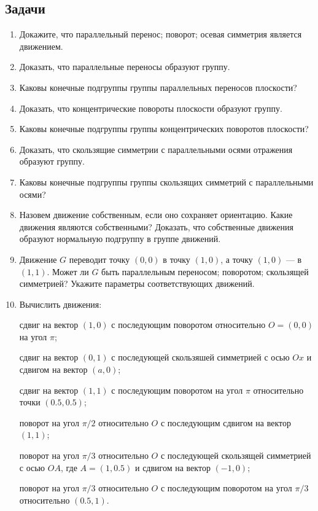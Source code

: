 \subsection*{Задачи}

\begin{enumerate}
\item Докажите, что \ipunkt параллельный перенос; \ipunkt поворот; \ipunkt осевая симметрия является движением.
\item Доказать, что параллельные переносы образуют группу.
\item Каковы конечные подгруппы группы параллельных переносов плоскости?
\item Доказать, что концентрические повороты плоскости образуют группу.
\item Каковы конечные подгруппы группы концентрических поворотов плоскости?
\item Доказать, что скользящие симметрии с параллельными осями отражения образуют группу.
\item Каковы конечные подгруппы группы скользящих симметрий с параллельными осями?
\item Назовем движение собственным, если оно сохраняет ориентацию. Какие движения являются собственными? Доказать, что собственные движения образуют нормальную подгруппу в группе движений.
\item Движение $G$ переводит точку $(0,0)$ в точку $(1,0)$, а точку $(1,0)$ --- в $(1,1)$. Может ли $G$ быть \ipunkt параллельным переносом; \ipunkt поворотом; \ipunkt скользящей симметрией? Укажите параметры соответствующих движений.
\item Вычислить движения:

\noindent\ipunkt сдвиг на вектор $(1,0)$ с последующим поворотом относительно $O=(0,0)$ на угол $\pi$;

\noindent\ipunkt сдвиг на вектор $(0,1)$ с последующей скользяшей симметрией с осью $Ox$ и сдвигом на вектор $(a,0)$;

\noindent\ipunkt сдвиг на вектор $(1,1)$ с последующим поворотом на угол $\pi$ относительно точки $(0.5,0.5)$;

\noindent\ipunkt поворот на угол $\pi/2$ относительно $O$ с последующим сдвигом на вектор $(1,1)$;

\noindent\ipunkt поворот на угол $\pi/3$ относительно $O$ с последующей скользящей симметрией с осью $OA$, где $A=(1,0.5)$ и сдвигом на вектор $(-1,0)$;

\noindent\ipunkt поворот на угол $\pi/3$ относительно $O$ с последующим поворотом на угол $\pi/3$ относительно $(0.5,1)$.


\end{enumerate}
